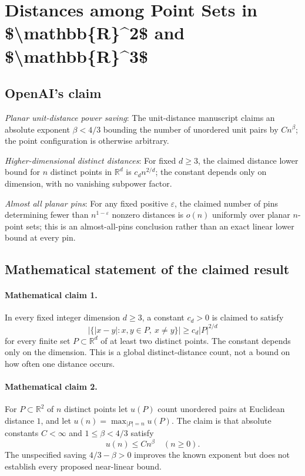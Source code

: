 \documentclass[11pt]{article}
\begin{document}
\section*{Distances among Point Sets in \$\textbackslash{}mathbb\{R\}\textasciicircum{}2\$ and \$\textbackslash{}mathbb\{R\}\textasciicircum{}3\$}

\subsection{OpenAI's claim}
\textit{Planar unit-distance power saving}: The unit-distance manuscript claims an absolute exponent $\beta<4/3$ bounding the number of unordered unit pairs by $C n^\beta$; the point configuration is otherwise arbitrary.

\textit{Higher-dimensional distinct distances}: For fixed $d\ge3$, the claimed distance lower bound for $n$ distinct points in $\mathbb R^d$ is $c_d n^{2/d}$; the constant depends only on dimension, with no vanishing subpower factor.

\textit{Almost all planar pins}: For any fixed positive $\varepsilon$, the claimed number of pins determining fewer than $n^{1-\varepsilon}$ nonzero distances is $o(n)$ uniformly over planar $n$-point sets; this is an almost-all-pins conclusion rather than an exact linear lower bound at every pin.

\subsection{Mathematical statement of the claimed result}
\paragraph{Mathematical claim 1.} In every fixed integer dimension $d\ge3$, a constant $c_d>0$ is claimed to satisfy \[\bigl|\{|x-y|:x,y\in P,\ x\ne y\}\bigr|\ge c_d|P|^{2/d}\] for every finite set $P\subset\mathbb R^d$ of at least two distinct points. The constant depends only on the dimension. This is a global distinct-distance count, not a bound on how often one distance occurs.

\paragraph{Mathematical claim 2.} For $P\subset\mathbb R^2$ of $n$ distinct points let $u(P)$ count unordered pairs at Euclidean distance $1$, and let $u(n)=\max_{|P|=n}u(P)$. The claim is that absolute constants $C<\infty$ and $1\le\beta<4/3$ satisfy \[u(n)\le Cn^\beta\quad(n\ge0).\] The unspecified saving $4/3-\beta>0$ improves the known exponent but does not establish every proposed near-linear bound.
\end{document}
